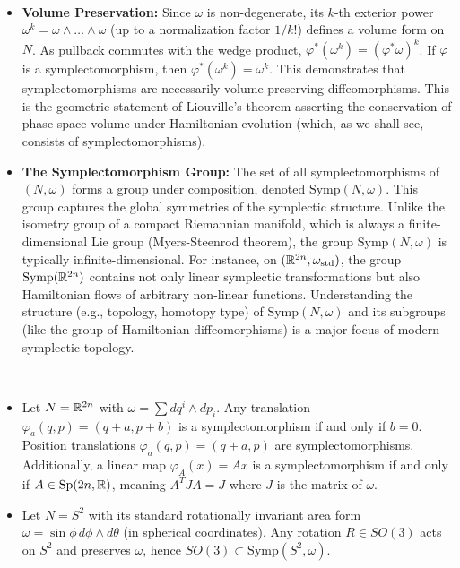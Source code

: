 \begin{remark}
\,
\begin{itemize}
    \item \textbf{Volume Preservation:} Since $\omega$ is non-degenerate, its $k$-th exterior power $\omega^k = \omega \wedge \dots \wedge \omega$ (up to a normalization factor $1/k!$) defines a volume form on $N$. As pullback commutes with the wedge product, $\varphi^*(\omega^k) = (\varphi^*\omega)^k$. If $\varphi$ is a symplectomorphism, then $\varphi^*(\omega^k) = \omega^k$. This demonstrates that symplectomorphisms are necessarily volume-preserving diffeomorphisms. This is the geometric statement of Liouville's theorem asserting the conservation of phase space volume under Hamiltonian evolution (which, as we shall see, consists of symplectomorphisms).
    \item \textbf{The Symplectomorphism Group:} The set of all symplectomorphisms of $(N, \omega)$ forms a group under composition, denoted $\text{Symp}(N, \omega)$. This group captures the global symmetries of the symplectic structure. Unlike the isometry group of a compact Riemannian manifold, which is always a finite-dimensional Lie group (Myers-Steenrod theorem), the group $\text{Symp}(N, \omega)$ is typically infinite-dimensional. For instance, on $(\mathbb{R}^{2n}, \omega_{\text{std}})$, the group $\text{Symp}(\mathbb{R}^{2n})$ contains not only linear symplectic transformations but also Hamiltonian flows of arbitrary non-linear functions. Understanding the structure (e.g., topology, homotopy type) of $\text{Symp}(N, \omega)$ and its subgroups (like the group of Hamiltonian diffeomorphisms) is a major focus of modern symplectic topology.
\end{itemize}
\end{remark}

\begin{example}
    \,
\begin{itemize}
    \item Let $N = \mathbb{R}^{2n}$ with $\omega = \sum dq^i \wedge dp_i$. Any translation $\varphi_a(q,p) = (q+a, p+b)$ is a symplectomorphism if and only if $b=0$. Position translations $\varphi_a(q,p) = (q+a, p)$ are symplectomorphisms. Additionally, a linear map $\varphi_A(x) = Ax$ is a symplectomorphism if and only if $A \in \text{Sp}(2n, \mathbb{R})$, meaning $A^T J A = J$ where $J$ is the matrix of $\omega$.
    \item Let $N = S^2$ with its standard rotationally invariant area form $\omega = \sin\phi \, d\phi \wedge d\theta$ (in spherical coordinates). Any rotation $R \in SO(3)$ acts on $S^2$ and preserves $\omega$, hence $SO(3) \subset \text{Symp}(S^2, \omega)$.
\end{itemize}
\end{example}

